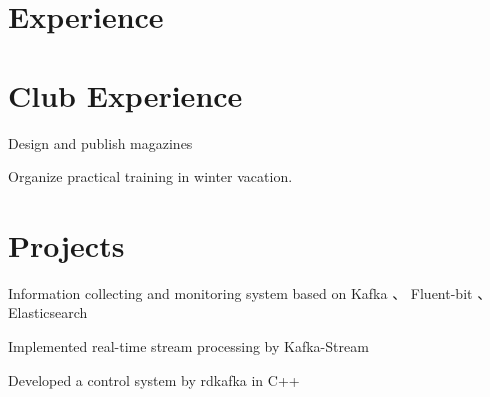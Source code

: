 \documentclass[]{deedy-resume-openfont}
\begin{document}
\begin{minipage}[t]{0.73\textwidth} 


\section{Experience}
\sectionsep


\sectionsep

\section{Club Experience}
\sectionsep

\begin{tightemize}
    \item
    \item Design and publish magazines
\end{tightemize}

\sectionsep

\begin{tightemize}
    \item Organize practical training in winter vacation.
\end{tightemize}

\sectionsep


\section{Projects}
\sectionsep

\begin{tightemize}
    \item Information collecting and monitoring system based on Kafka 、 Fluent-bit 、 Elasticsearch
    \item Implemented real-time stream processing by Kafka-Stream
    \item Developed a control system by rdkafka in C++
\end{tightemize}
\sectionsep


\end{minipage}
\end{document}
